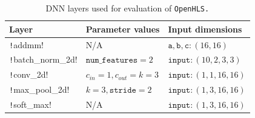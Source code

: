 \documentclass[10pt]{sig-alternate}
\begin{document}
\begin{table}[tbh]
\caption{DNN layers used for evaluation of \texttt{OpenHLS.}\label{tab:Resource-usage-for-2}}
\centering{}%
\begin{tabular}{lll}
\toprule
Layer & Parameter values & Input dimensions\tabularnewline
\midrule
\texttt!addmm! & N/A &
$\texttt{a}, \texttt{b}, \texttt{c}: \left(16,16\right)$\tabularnewline
\midrule
\texttt!batch_norm_2d! & $\texttt{num\_features}=2$ & $\texttt{input}: \left(10,2,3,3\right)$\tabularnewline
\midrule
\texttt!conv_2d! & $c_{in}=1, c_{out}=k=3$ & $\texttt{input}: \left(1,1,16,16\right)$\tabularnewline
\midrule
\texttt!max_pool_2d! & $k=3, \texttt{stride}=2$ & $\texttt{input}: \left(1,3,16,16\right)$\tabularnewline
\midrule
\texttt!soft_max! & N/A & $\texttt{input}: \left(1,3,16,16\right)$\tabularnewline
\bottomrule
\end{tabular}
\end{table}
\end{document}
